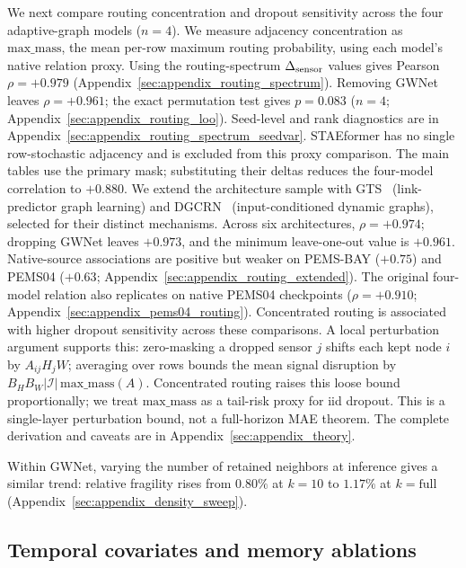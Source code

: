 We next compare routing concentration and dropout sensitivity across the four adaptive-graph models ($n{=}4$). We measure adjacency concentration as
$\text{max\_mass}$, the mean per-row maximum routing probability, using each
model's native relation proxy. Using the routing-spectrum $\Delta_{\text{sensor}}$ values gives Pearson $\rho{=}{+}0.979$
(Appendix~\ref{sec:appendix_routing_spectrum}). Removing GWNet leaves
$\rho{=}{+}0.961$; the exact permutation test gives $p{=}0.083$
($n{=}4$; Appendix~\ref{sec:appendix_routing_loo}).
Seed-level and rank diagnostics are in
Appendix~\ref{sec:appendix_routing_spectrum_seedvar}. STAEformer has no single
row-stochastic adjacency and is excluded from this proxy comparison.
The main tables use the primary mask; substituting their deltas
reduces the four-model correlation to $+0.880$.
We extend the architecture sample with GTS~\citep{shang2021discrete}
(link-predictor graph learning) and DGCRN~\citep{li2023dgcrn}
(input-conditioned dynamic graphs), selected for their distinct mechanisms.
Across six architectures, $\rho{=}{+}0.974$;
dropping GWNet leaves $+0.973$, and the minimum leave-one-out value is $+0.961$.
Native-source associations are positive but weaker on PEMS-BAY ($+0.75$) and
PEMS04 ($+0.63$; Appendix~\ref{sec:appendix_routing_extended}).
The original four-model relation also replicates on native PEMS04 checkpoints
($\rho{=}{+}0.910$; Appendix~\ref{sec:appendix_pems04_routing}). Concentrated routing is associated with higher dropout sensitivity across these comparisons.
A local perturbation argument supports this: zero-masking a dropped sensor $j$
shifts each kept node $i$ by $A_{ij}H_jW$; averaging over rows bounds the
mean signal disruption by $B_H B_W |\mathcal{I}|\,\mathrm{max\_mass}(A)$.
Concentrated routing raises this loose bound proportionally; we treat
$\mathrm{max\_mass}$ as a tail-risk proxy for iid dropout.
This is a single-layer perturbation bound, not a full-horizon MAE theorem. The
complete derivation and caveats are in Appendix~\ref{sec:appendix_theory}.

Within GWNet, varying the number of retained neighbors at inference gives a similar trend:
relative fragility rises from $0.80\%$ at $k{=}10$ to $1.17\%$ at
$k{=}\text{full}$ (Appendix~\ref{sec:appendix_density_sweep}).

\subsection{Temporal covariates and memory ablations}
\label{sec:polish_ablations}

